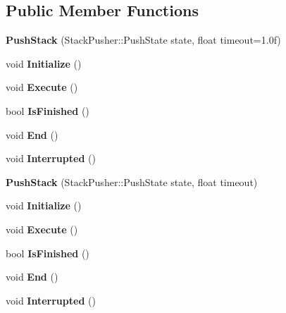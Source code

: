\subsection*{Public Member Functions}
\begin{DoxyCompactItemize}
\item 
\hypertarget{class_push_stack_a73a7fff0b4f7c9571a5ae691139fe142}{}{\bfseries Push\+Stack} (Stack\+Pusher\+::\+Push\+State state, float timeout=1.\+0f)\label{class_push_stack_a73a7fff0b4f7c9571a5ae691139fe142}

\item 
\hypertarget{class_push_stack_a1291d2e211f1bf44216f0f266fc3ecaf}{}void {\bfseries Initialize} ()\label{class_push_stack_a1291d2e211f1bf44216f0f266fc3ecaf}

\item 
\hypertarget{class_push_stack_a62a7ae2f353f571013fc3390b5ef2c00}{}void {\bfseries Execute} ()\label{class_push_stack_a62a7ae2f353f571013fc3390b5ef2c00}

\item 
\hypertarget{class_push_stack_a069a815bf23a1ebb23bd06cd5857cf64}{}bool {\bfseries Is\+Finished} ()\label{class_push_stack_a069a815bf23a1ebb23bd06cd5857cf64}

\item 
\hypertarget{class_push_stack_aafe17639306c2ff486e0a6e68e0d39d4}{}void {\bfseries End} ()\label{class_push_stack_aafe17639306c2ff486e0a6e68e0d39d4}

\item 
\hypertarget{class_push_stack_ada647a33df2d9e21dbbe29af3e17753b}{}void {\bfseries Interrupted} ()\label{class_push_stack_ada647a33df2d9e21dbbe29af3e17753b}

\item 
\hypertarget{class_push_stack_a1f855f7ebb460485bbf8a3f6dd3b3838}{}{\bfseries Push\+Stack} (Stack\+Pusher\+::\+Push\+State state, float timeout)\label{class_push_stack_a1f855f7ebb460485bbf8a3f6dd3b3838}

\item 
\hypertarget{class_push_stack_a1291d2e211f1bf44216f0f266fc3ecaf}{}void {\bfseries Initialize} ()\label{class_push_stack_a1291d2e211f1bf44216f0f266fc3ecaf}

\item 
\hypertarget{class_push_stack_a62a7ae2f353f571013fc3390b5ef2c00}{}void {\bfseries Execute} ()\label{class_push_stack_a62a7ae2f353f571013fc3390b5ef2c00}

\item 
\hypertarget{class_push_stack_a069a815bf23a1ebb23bd06cd5857cf64}{}bool {\bfseries Is\+Finished} ()\label{class_push_stack_a069a815bf23a1ebb23bd06cd5857cf64}

\item 
\hypertarget{class_push_stack_aafe17639306c2ff486e0a6e68e0d39d4}{}void {\bfseries End} ()\label{class_push_stack_aafe17639306c2ff486e0a6e68e0d39d4}

\item 
\hypertarget{class_push_stack_ada647a33df2d9e21dbbe29af3e17753b}{}void {\bfseries Interrupted} ()\label{class_push_stack_ada647a33df2d9e21dbbe29af3e17753b}

\end{DoxyCompactItemize}
